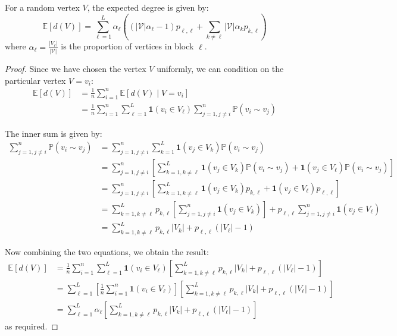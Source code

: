 \documentclass{article}
\begin{document}
\begin{proposition}
    For a random vertex $V$, the expected degree is given by:
    \begin{equation*}
        \mathbb{E}[d(V)] = \sum_{\ell=1}^L \alpha_{\ell}\left((|\mathcal{V}|\alpha_{\ell}-1)p_{\ell,\ell}+\sum_{k\ne\ell}|\mathcal{V}|\alpha_{k}p_{k,\ell}\right)
    \end{equation*}
    where $\alpha_{\ell} = \frac{|V_{\ell}|}{|\mathcal{V}|}$ is the proportion of vertices in block $\ell$.
\end{proposition}
\begin{proof}
    Since we have chosen the vertex $V$ uniformly, we can condition on the particular vertex $V=v_i$:
    \begin{align*}
        \mathbb{E}[d(V)] &= \frac{1}{n} \sum_{i=1}^n \mathbb{E}[d(V)\mid V=v_i]\\
        &= \frac{1}{n} \sum_{i=1}^n \sum_{\ell=1}^L \mathbf{1}(v_i \in V_{\ell}) \sum_{j=1, j\neq i}^n \mathbb{P}(v_i \sim v_j)
    \end{align*}

    The inner sum is given by:
    \begin{align*}
        \sum_{j=1, j\neq i}^n \mathbb{P}(v_i \sim v_j) &= \sum_{j=1, j\neq i}^n \sum_{k=1}^L \mathbf{1}(v_j \in V_k) \mathbb{P}(v_i \sim v_j)\\
        &= \sum_{j=1, j\neq i}^n \left[\sum_{k=1, k\neq \ell}^L \mathbf{1}(v_j \in V_k) \mathbb{P}(v_i \sim v_j) + \mathbf{1}(v_j \in V_\ell) \mathbb{P}(v_i \sim v_j)\right]\\
        &= \sum_{j=1, j\neq i}^n \left[\sum_{k=1, k\neq \ell}^L \mathbf{1}(v_j \in V_k) p_{k,\ell} + \mathbf{1}(v_j \in V_\ell) p_{\ell, \ell}\right]\\
        &= \sum_{k=1, k\neq \ell}^L p_{k,\ell} \left[\sum_{j=1, j\neq i}^n \mathbf{1}(v_j \in V_k)\right]  +p_{\ell, \ell} \sum_{j=1, j\neq i}^n \mathbf{1}(v_j \in V_\ell) \\
        &= \sum_{k=1, k\neq \ell}^L p_{k,\ell} |V_k| + p_{\ell, \ell} (|V_\ell|-1)
    \end{align*}

    Now combining the two equations, we obtain the result:
    \begin{align*}
        \mathbb{E}[d(V)] &= \frac{1}{n} \sum_{i=1}^n \sum_{\ell=1}^L \mathbf{1}(v_i \in V_{\ell}) \left[\sum_{k=1, k\neq \ell}^L p_{k,\ell} |V_k| + p_{\ell, \ell} (|V_\ell|-1)\right]\\
        &= \sum_{\ell=1}^L \left[\frac{1}{n} \sum_{i=1}^{n} \mathbf{1}(v_i \in V_{\ell})\right] \left[\sum_{k=1, k\neq \ell}^L p_{k,\ell} |V_k| + p_{\ell, \ell} (|V_\ell|-1)\right]\\
        &= \sum_{\ell=1}^{L} \alpha_\ell \left[\sum_{k=1, k\neq \ell}^L p_{k,\ell} |V_k| + p_{\ell, \ell} (|V_\ell|-1)\right]
    \end{align*}
    as required.  
\end{proof}
\end{document}
